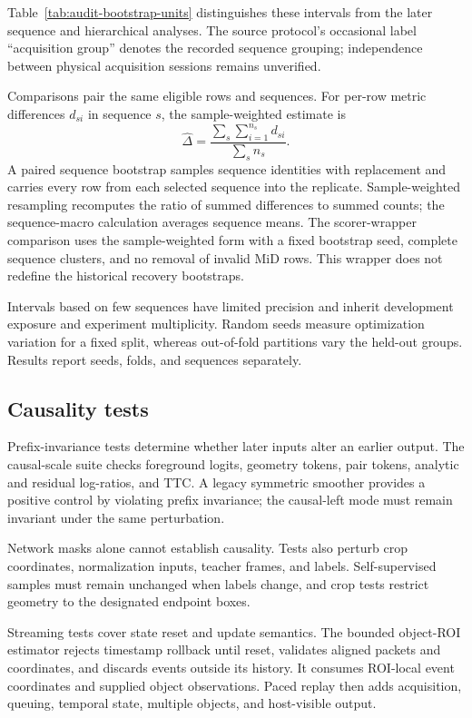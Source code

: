 Table~\ref{tab:audit-bootstrap-units} distinguishes these intervals from the later sequence and hierarchical analyses. The source protocol's occasional label ``acquisition group'' denotes the recorded sequence grouping; independence between physical acquisition sessions remains unverified.


Comparisons pair the same eligible rows and sequences. For per-row metric differences $d_{si}$ in sequence $s$, the sample-weighted estimate is
\begin{equation}
 \widehat\Delta=\frac{\sum_s\sum_{i=1}^{n_s}d_{si}}{\sum_s n_s}.
\end{equation}
A paired sequence bootstrap samples sequence identities with replacement and carries every row from each selected sequence into the replicate. Sample-weighted resampling recomputes the ratio of summed differences to summed counts; the sequence-macro calculation averages sequence means. The scorer-wrapper comparison uses the sample-weighted form with a fixed bootstrap seed, complete sequence clusters, and no removal of invalid MiD rows. This wrapper does not redefine the historical recovery bootstraps. 

Intervals based on few sequences have limited precision and inherit development exposure and experiment multiplicity. Random seeds measure optimization variation for a fixed split, whereas out-of-fold partitions vary the held-out groups. Results report seeds, folds, and sequences separately.

\subsection{Causality tests}
Prefix-invariance tests determine whether later inputs alter an earlier output. The causal-scale suite checks foreground logits, geometry tokens, pair tokens, analytic and residual log-ratios, and TTC. A legacy symmetric smoother provides a positive control by violating prefix invariance; the causal-left mode must remain invariant under the same perturbation. 

Network masks alone cannot establish causality. Tests also perturb crop coordinates, normalization inputs, teacher frames, and labels. Self-supervised samples must remain unchanged when labels change, and crop tests restrict geometry to the designated endpoint boxes.

Streaming tests cover state reset and update semantics. The bounded object-ROI estimator rejects timestamp rollback until reset, validates aligned packets and coordinates, and discards events outside its history. It consumes ROI-local event coordinates and supplied object observations. Paced replay then adds acquisition, queuing, temporal state, multiple objects, and host-visible output. 

